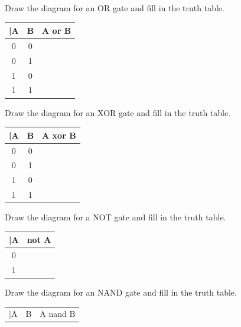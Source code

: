 \documentclass[letterpaper,12pt]{exam}
\begin{document}
\begin{questions}
\begin{samepage}
    \question Draw the diagram for an OR gate and fill in the truth table.
    \par
    \begin{tabular}{|c|c|c|}
      |A & B & A or B \\
      \hline
      \hline
      0 & 0 &  \\
      \hline
      0 & 1 &  \\
      \hline
      1 & 0 &  \\
      \hline
      1 & 1 &  \\  
      \hline     
    \end{tabular}
    \vspace{5mm}
\end{samepage}
\par
\begin{samepage}
    \question Draw the diagram for an XOR gate and fill in the truth table.
    \par
    \begin{tabular}{|c|c|c|}
      |A & B & A xor B \\
      \hline
      \hline
      0 & 0 &  \\
      \hline
      0 & 1 &  \\
      \hline
      1 & 0 &  \\
      \hline
      1 & 1 &  \\  
      \hline     
    \end{tabular}
    \vspace{5mm}
\end{samepage}
\par
\begin{samepage}
    \question Draw the diagram for a NOT gate and fill in the truth table.
    \par
    \begin{tabular}{|c|c|}
      |A & not A \\
      \hline
      \hline
      0 &   \\
      \hline
      1 &   \\
      \hline    
    \end{tabular}
    \vspace{5mm}
\end{samepage}
\begin{samepage}
    \question Draw the diagram for an NAND gate and fill in the truth table.
    \par
    \begin{tabular}{|c|c|c|}
      |A & B & A nand B \\

\end{tabular}
\end{samepage}
\end{questions}
\end{document}
